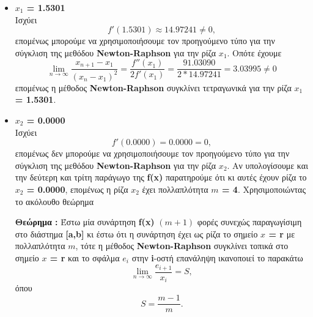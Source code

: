 \documentclass[First Project.tex]{subfiles}
\begin{document}
\begin{itemize}
        \item \textbf{$x_{1}$ = 1.5301} \\
            Ισχύει 
            \begin{equation*}
                f'( 1.5301 ) \approx 14.97241 \neq 0 ,
            \end{equation*}   
            επομένως μπορούμε να χρησιμοποιήσουμε τον προηγούμενο τύπο για την σύγκλιση της μεθόδου \textlatin{\textbf{Newton-Raphson}} για 
            την ρίζα \textlatin{\textbf{$x_{1}$}}. Οπότε έχουμε
            \begin{equation*}
                \lim_{n\to\infty} \frac{x_{n+1} - x_{1}}{(x_{n} - x_{1})^{2}} = \frac{f''(x_{1})}{2f'(x_{1})} = \frac{91.03090}{2 * 14.97241} = 3.03995 \neq 0
            \end{equation*}
            επομένως η μέθοδος \textlatin{\textbf{Newton-Raphson}} συγκλίνει τετραγωνικά για την ρίζα \textbf{$x_{1}$ = 1.5301}.
        \item \textbf{$x_{2}$ = 0.0000} \\
            Ισχύει 
            \begin{equation*}
                f'( 0.0000 ) = 0.0000 = 0 ,
            \end{equation*}   
            επομένως δεν μπορούμε να χρησιμοποιήσουμε τον προηγούμενο τύπο για την σύγκλιση της μεθόδου \textlatin{\textbf{Newton-Raphson}} για 
            την ρίζα \textlatin{\textbf{$x_{2}$}}. Αν υπολογίσουμε και την δεύτερη και τρίτη παράγωγο της \textlatin{\textbf{f(x)}} παρατηρούμε ότι
            κι αυτές έχουν ρίζα το \textbf{$x_{2}$ = 0.0000}, επομένως η ρίζα \textbf{$x_{2}$} έχει πολλαπλότητα \textbf{$m$ = 4}. Χρησιμοποιώντας το 
            ακόλουθο θεώρημα 
            
            \large{\textbf{Θεώρημα : }} \normalsize Έστω μία συνάρτηση \textlatin{\textbf{f(x)}} $( m+1 )$ φορές συνεχώς παραγωγίσιμη στο διάστημα \textlatin{\textbf{[a,b]}} κι
            έστω ότι η συνάρτηση έχει ως ρίζα το σημείο \textbf{\textlatin{$x$ = r}} με πολλαπλότητα \textbf{$m$}, τότε η μέθοδος \textlatin{\textbf{Newton-Raphson}}
            συγκλίνει τοπικά στο σημείο \textbf{\textlatin{$x$ = r}} και το σφάλμα \textbf{\textlatin{$e_{i}$}} στην \textlatin{\textbf{i}}-οστή  
            επανάληψη ικανοποιεί το παρακάτω 
            \begin{equation*}
                \lim_{n\to\infty} \frac{e_{i+1}}{x_{i}} = S,     
            \end{equation*}
            όπου
            \begin{equation*}
                S = \frac{m-1}{m}.
            \end{equation*}


\end{itemize}
\end{document}
